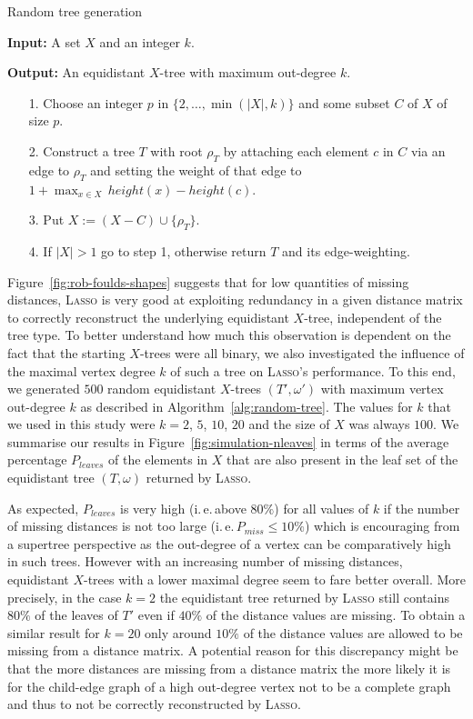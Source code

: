 \begin{algorithm}[h!]
  \caption{Random tree generation}
  \label{alg:random-tree}
  \textbf{Input:} A set $X$ and an integer $k$.
  
  \textbf{Output:} An equidistant $X$-tree with maximum
  out-degree $k$.

  \begin{itemize}
  \item[1.] Choose an integer 
$p$ in $\{2, \dotsc, \min(|X|,k)\}$ and some subset $C$ of $X$ of size $p$.
  \item[2.] Construct a tree $T$ with root $\rho_T$ by
attaching each element $c$ in $C$ via an edge to $\rho_T$ 
and setting the weight of that edge to $ 1+ \max_{x \in X} \, height(x)
- height(c)$.
  \item[3.] Put $X := (X - C) \cup \{\rho_T\}$.
  \item[4.] If $|X| > 1$ go to step 1, otherwise return $T$ 
    and its edge-weighting.
  \end{itemize}
\end{algorithm}

Figure~\ref{fig:rob-foulds-shapes} suggests that for low quantities of missing
distances, \textsc{Lasso} is very good at exploiting redundancy in a given
distance matrix to correctly reconstruct the underlying equidistant $X$-tree,
independent of the tree type. To better understand how much this observation
is dependent on the fact that the starting $X$-trees were all binary, we also
investigated the influence of the maximal vertex degree $k$ of such a tree on
\textsc{Lasso}'s performance. To this end, we generated $500$ random
equidistant $X$-trees $(T',\omega')$ with maximum vertex out-degree $k$ as
described in Algorithm~\ref{alg:random-tree}.  The values for $k$ that we used
in this study were $k=2$, $5$, $10$, $20$ and the size of $X$ was always
$100$. We summarise our results in Figure~\ref{fig:simulation-nleaves} in
terms of the average percentage $P_{leaves}$ of the elements in $X$ that are
also present in the leaf set of the equidistant tree $(T,\omega)$ returned by
\textsc{Lasso}.

As expected, $P_{leaves}$ is very high (i.\,e.\,above $80\%$) for all values
of $k$ if the number of missing distances is not too large
(i.\,e.\,$P_{miss}\leq 10\%$) which is encouraging from a supertree
perspective as the out-degree of a vertex can be comparatively high in such
trees.  However with an increasing number of missing distances, equidistant
$X$-trees with a lower maximal degree seem to fare better overall. More
precisely, in the case $k=2$ the equidistant tree returned by \textsc{Lasso}
still contains $80\%$ of the leaves of $T'$ even if $40\%$ of the distance
values are missing. To obtain a similar result for $k=20$ only around $10\%$
of the distance values are allowed to be missing from a distance matrix.  A
potential reason for this discrepancy might be that the more distances are
missing from a distance matrix the more likely it is for the child-edge graph
of a high out-degree vertex not to be a complete graph and thus to not be
correctly reconstructed by \textsc{Lasso}.

